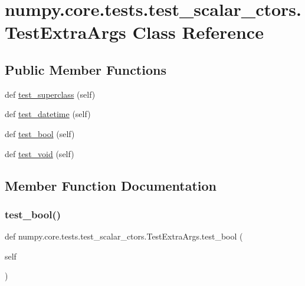 \hypertarget{classnumpy_1_1core_1_1tests_1_1test__scalar__ctors_1_1TestExtraArgs}{}\section{numpy.\+core.\+tests.\+test\+\_\+scalar\+\_\+ctors.\+Test\+Extra\+Args Class Reference}
\label{classnumpy_1_1core_1_1tests_1_1test__scalar__ctors_1_1TestExtraArgs}
\subsection*{Public Member Functions}
\begin{DoxyCompactItemize}
\item 
def \hyperlink{classnumpy_1_1core_1_1tests_1_1test__scalar__ctors_1_1TestExtraArgs_ab72979efcb3bc4558df6e3046df952c8}{test\+\_\+superclass} (self)
\item 
def \hyperlink{classnumpy_1_1core_1_1tests_1_1test__scalar__ctors_1_1TestExtraArgs_ae9bac5ee3e4427b4a5b8889f36a20f58}{test\+\_\+datetime} (self)
\item 
def \hyperlink{classnumpy_1_1core_1_1tests_1_1test__scalar__ctors_1_1TestExtraArgs_adaa8f2a07997b7a26417cbd6cb3bdaa2}{test\+\_\+bool} (self)
\item 
def \hyperlink{classnumpy_1_1core_1_1tests_1_1test__scalar__ctors_1_1TestExtraArgs_a3e4666f7b15acad7de91c1e350e8bfef}{test\+\_\+void} (self)
\end{DoxyCompactItemize}


\subsection{Member Function Documentation}
\mbox{\label{classnumpy_1_1core_1_1tests_1_1test__scalar__ctors_1_1TestExtraArgs_adaa8f2a07997b7a26417cbd6cb3bdaa2}} 
\subsubsection{\texorpdfstring{test\+\_\+bool()}{test\_bool()}}
{\footnotesize\ttfamily def numpy.\+core.\+tests.\+test\+\_\+scalar\+\_\+ctors.\+Test\+Extra\+Args.\+test\+\_\+bool (\begin{DoxyParamCaption}\item[{}]{self }\end{DoxyParamCaption})}

